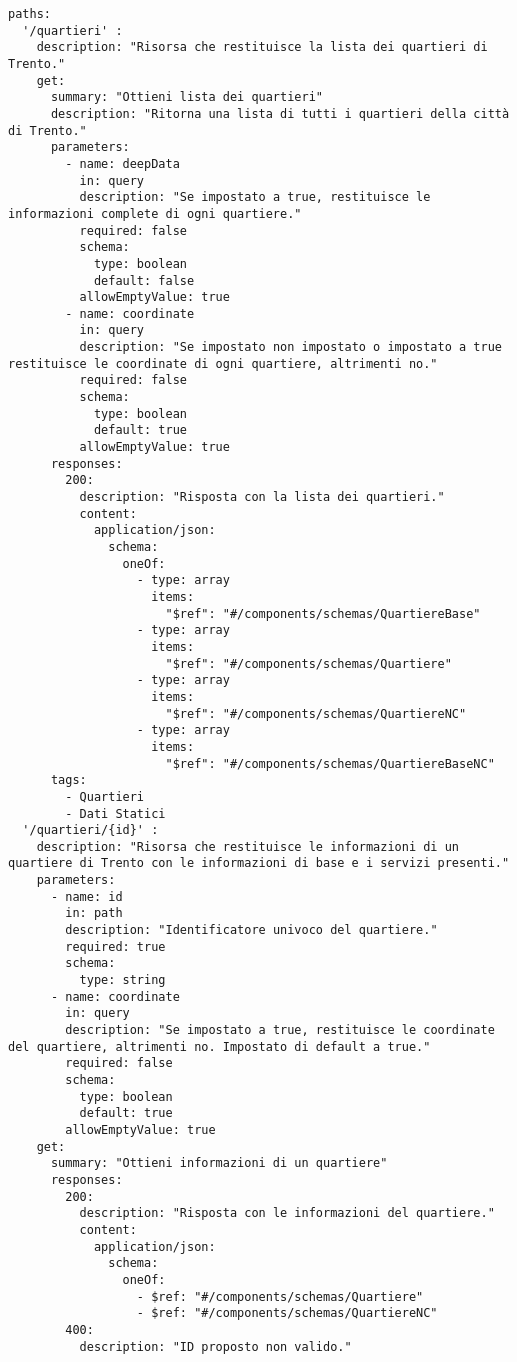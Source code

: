 \begin{verbatim}
paths:
  '/quartieri' :
    description: "Risorsa che restituisce la lista dei quartieri di Trento."
    get: 
      summary: "Ottieni lista dei quartieri"
      description: "Ritorna una lista di tutti i quartieri della città di Trento."
      parameters:
        - name: deepData
          in: query
          description: "Se impostato a true, restituisce le informazioni complete di ogni quartiere."
          required: false
          schema:
            type: boolean
            default: false
          allowEmptyValue: true
        - name: coordinate
          in: query
          description: "Se impostato non impostato o impostato a true restituisce le coordinate di ogni quartiere, altrimenti no."
          required: false
          schema:
            type: boolean
            default: true
          allowEmptyValue: true
      responses: 
        200: 
          description: "Risposta con la lista dei quartieri."
          content:
            application/json:
              schema: 
                oneOf:
                  - type: array
                    items: 
                      "$ref": "#/components/schemas/QuartiereBase"
                  - type: array
                    items: 
                      "$ref": "#/components/schemas/Quartiere"
                  - type: array
                    items: 
                      "$ref": "#/components/schemas/QuartiereNC"
                  - type: array
                    items: 
                      "$ref": "#/components/schemas/QuartiereBaseNC"
      tags:
        - Quartieri
        - Dati Statici
  '/quartieri/{id}' :
    description: "Risorsa che restituisce le informazioni di un quartiere di Trento con le informazioni di base e i servizi presenti."
    parameters:
      - name: id
        in: path
        description: "Identificatore univoco del quartiere."
        required: true
        schema:
          type: string
      - name: coordinate
        in: query
        description: "Se impostato a true, restituisce le coordinate del quartiere, altrimenti no. Impostato di default a true."
        required: false
        schema:
          type: boolean
          default: true
        allowEmptyValue: true
    get: 
      summary: "Ottieni informazioni di un quartiere"
      responses: 
        200:
          description: "Risposta con le informazioni del quartiere."
          content:
            application/json: 
              schema:
                oneOf:
                  - $ref: "#/components/schemas/Quartiere"
                  - $ref: "#/components/schemas/QuartiereNC"
        400:
          description: "ID proposto non valido."

\end{verbatim}
